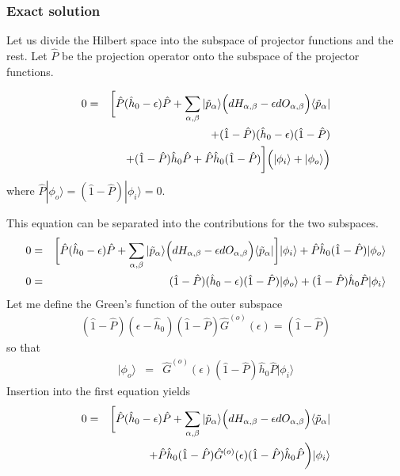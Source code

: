 \documentclass[11pt,a4paper]{report}
\begin{document}
\subsubsection{Exact solution}
Let us divide the Hilbert space into the subspace of projector
functions and the rest. Let $\hat{P}$ be the projection operator onto
the subspace of the projector functions.

\begin{eqnarray}
0&=&\biggl[
\hat{P}(\hat{h}_0-\epsilon)\hat{P}+\sum_{\alpha,\beta}|\tilde{p}_\alpha\rangle
\Bigl(dH_{\alpha,\beta}-\epsilon dO_{\alpha,\beta}\Bigr)
\langle\tilde{p}_\alpha|
\nonumber\\
&&+(\hat{1}-\hat{P})(\hat{h}_0-\epsilon)(\hat{1}-\hat{P})
\nonumber\\
&&+(\hat{1}-\hat{P})\hat{h}_0\hat{P}+\hat{P}\hat{h}_0(\hat{1}-\hat{P})
\biggr]\Bigl(|\phi_i\rangle +|\phi_o\rangle\Bigr)
\end{eqnarray}
where $\hat{P}|\phi_o\rangle=(\hat{1}-\hat{P})|\phi_i\rangle=0$.

This equation can be separated into the contributions for the two subspaces.
\begin{eqnarray}
0&=&\biggl[
\hat{P}(\hat{h}_0-\epsilon)\hat{P}+\sum_{\alpha,\beta}|\tilde{p}_\alpha\rangle
\Bigl(dH_{\alpha,\beta}-\epsilon dO_{\alpha,\beta}\Bigr)
\langle\tilde{p}_\alpha|
\biggr]|\phi_i\rangle
+\hat{P}\hat{h}_0(\hat{1}-\hat{P})|\phi_o\rangle
\nonumber\\
0&=&(\hat{1}-\hat{P})(\hat{h}_0-\epsilon)(\hat{1}-\hat{P})|\phi_o\rangle
+(\hat{1}-\hat{P})\hat{h}_0\hat{P}|\phi_i\rangle 
\end{eqnarray}
Let me define the Green's function of the outer subspace
\begin{eqnarray}
(\hat{1}-\hat{P})(\epsilon-\hat{h}_0)(\hat{1}-\hat{P})\hat{G}^{(o)}(\epsilon)
=(\hat{1}-\hat{P})
\end{eqnarray}
so that
\begin{eqnarray}
|\phi_o\rangle&=&
\hat{G}^{(o)}(\epsilon)(\hat{1}-\hat{P})\hat{h}_0\hat{P}|\phi_i\rangle 
\end{eqnarray}
Insertion into the first equation yields
\begin{eqnarray}
0&=&\biggl[
\hat{P}(\hat{h}_0-\epsilon)\hat{P}+\sum_{\alpha,\beta}|\tilde{p}_\alpha\rangle
\Bigl(dH_{\alpha,\beta}-\epsilon dO_{\alpha,\beta}\Bigr)
\langle\tilde{p}_\alpha|
\nonumber\\
&&+\hat{P}\hat{h}_0(\hat{1}-\hat{P})
\hat{G}^{(o)}(\epsilon)(\hat{1}-\hat{P})\hat{h}_0\hat{P}\biggr)|\phi_i\rangle 
\end{eqnarray}
\end{document}
